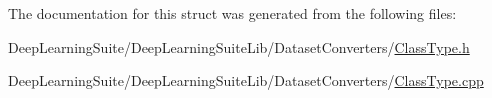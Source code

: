 The documentation for this struct was generated from the following files\+:\begin{DoxyCompactItemize}
\item 
Deep\+Learning\+Suite/\+Deep\+Learning\+Suite\+Lib/\+Dataset\+Converters/\hyperlink{_class_type_8h}{Class\+Type.\+h}\item 
Deep\+Learning\+Suite/\+Deep\+Learning\+Suite\+Lib/\+Dataset\+Converters/\hyperlink{_class_type_8cpp}{Class\+Type.\+cpp}\end{DoxyCompactItemize}
